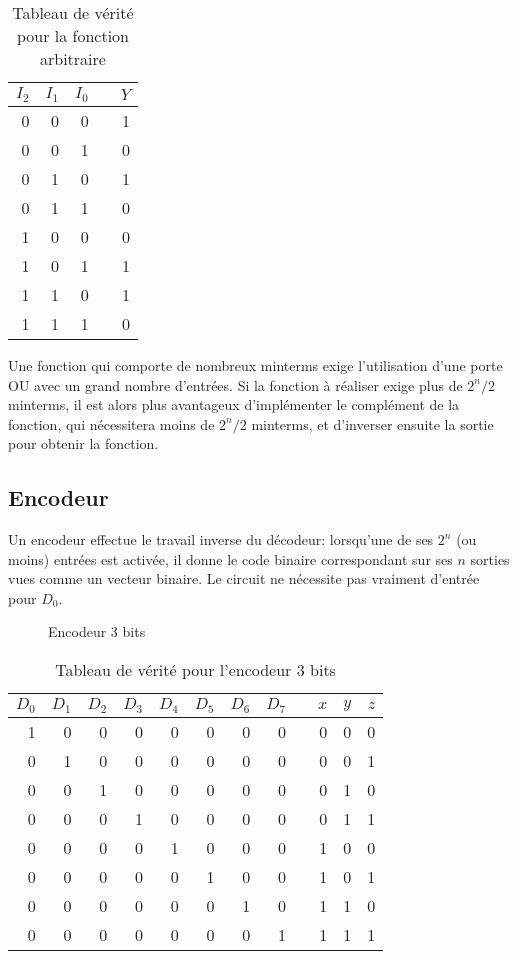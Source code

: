 \documentclass[11pt]{article}
\begin{document}
\begin{table}[htbp]
\caption{\label{tab:org77fe386}Tableau de vérité pour la fonction arbitraire}
\centering
\begin{tabular}{rrrlr}
\(I_2\) & \(I_1\) & \(I_0\) &  & \(Y\)\\
\hline
0 & 0 & 0 &  & 1\\
0 & 0 & 1 &  & 0\\
0 & 1 & 0 &  & 1\\
0 & 1 & 1 &  & 0\\
1 & 0 & 0 &  & 0\\
1 & 0 & 1 &  & 1\\
1 & 1 & 0 &  & 1\\
1 & 1 & 1 &  & 0\\
\end{tabular}
\end{table}

Une fonction qui comporte de nombreux minterms exige l'utilisation
d'une porte OU avec un grand nombre d'entrées. Si la fonction à
réaliser exige plus de \(2^n/2\) minterms, il est alors plus
avantageux d'implémenter le complément de la fonction, qui nécessitera
moins de \(2^n/2\) minterms, et d'inverser ensuite la sortie pour
obtenir la fonction.

\subsection{Encodeur}
\label{sec:org3627650}

Un encodeur effectue le travail inverse du décodeur: lorsqu'une de ses
\(2^n\) (ou moins) entrées est activée, il donne le code binaire
correspondant sur ses \(n\) sorties vues comme un vecteur binaire. Le
circuit ne nécessite pas vraiment d'entrée pour \(D_0\).


\begin{figure}[htbp]
\centering

\caption{\label{fig:org009e3aa}Encodeur 3 bits}
\end{figure}


\begin{table}[htbp]
\caption{\label{tab:orgadf837d}Tableau de vérité pour l'encodeur 3 bits}
\centering
\begin{tabular}{rrrrrrrrlrrr}
\(D_0\) & \(D_1\) & \(D_2\) & \(D_3\) & \(D_4\) & \(D_5\) & \(D_6\) & \(D_7\) &  & \(x\) & \(y\) & \(z\)\\
\hline
1 & 0 & 0 & 0 & 0 & 0 & 0 & 0 &  & 0 & 0 & 0\\
0 & 1 & 0 & 0 & 0 & 0 & 0 & 0 &  & 0 & 0 & 1\\
0 & 0 & 1 & 0 & 0 & 0 & 0 & 0 &  & 0 & 1 & 0\\
0 & 0 & 0 & 1 & 0 & 0 & 0 & 0 &  & 0 & 1 & 1\\
0 & 0 & 0 & 0 & 1 & 0 & 0 & 0 &  & 1 & 0 & 0\\
0 & 0 & 0 & 0 & 0 & 1 & 0 & 0 &  & 1 & 0 & 1\\
0 & 0 & 0 & 0 & 0 & 0 & 1 & 0 &  & 1 & 1 & 0\\
0 & 0 & 0 & 0 & 0 & 0 & 0 & 1 &  & 1 & 1 & 1\\
\end{tabular}
\end{table}
\end{document}
